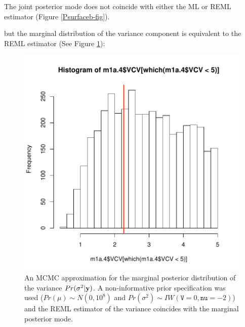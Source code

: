 \documentclass{article}
\begin{document}
The joint posterior mode does not coincide with either the ML or REML estimator (Figure \ref{Psurfaceb-fig}).  


but the marginal distribution of the variance component is equivalent to the REML estimator (See Figure \ref{Pmarg.NI-fig}):

\iftalk
\else
\fi

\begin{figure}[!h]
\begin{center}
\includegraphics{Lecture1-075}
\end{center}
\caption{An MCMC approximation for the marginal posterior distribution of the variance $Pr(\sigma^{2} | {\bf y})$.  A non-informative prior specification was used ($Pr(\mu)\sim N(0, 10^8)$ and  $Pr(\sigma^{2})\sim IW(\texttt{V}=0, \texttt{nu}=-2)$) and the REML estimator of the variance coincides with the marginal posterior mode.}
\label{Pmarg.NI-fig}
\end{figure}


\ifalone
\end{document}
